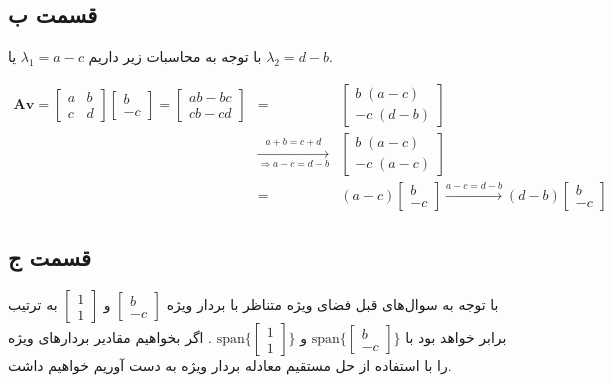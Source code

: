 \documentclass[14pt,a4]{article}
\begin{document}
\subsection*{قسمت ب}

با توجه به محاسبات زیر داریم $\lambda_1 = a-c$ یا $\lambda_2 = d-b$.

\begin{eqnarray*}
    \textbf{Av} =
        \begin{bmatrix}
            a & b \\
            c & d
        \end{bmatrix}
        \begin{bmatrix}
            b \\
            -c
        \end{bmatrix} =
        \begin{bmatrix}
            ab - bc \\
            cb - cd
        \end{bmatrix}  & = &
        \begin{bmatrix}
            b\; (a-c) \\
            -c\; (d-b)
        \end{bmatrix} \\
        & \xrightarrow[\Rightarrow a-c = d-b]{a+b=c+d} &
        \begin{bmatrix}
            b\;(a-c) \\
            -c \; (a-c)
        \end{bmatrix} \\
        & = &  (a-c) \begin{bmatrix}
            b \\
            -c
        \end{bmatrix} \xrightarrow[]{a-c = d-b} (d-b) \begin{bmatrix}
            b \\
            -c
        \end{bmatrix}
\end{eqnarray*}

\subsection*{قسمت ج}

با توجه به سوال‌های قبل فضای ویژه متناظر با بردار ویژه $\begin{bmatrix}b \\ -c \end{bmatrix}$ و $\begin{bmatrix}1 \\ 1 \end{bmatrix}$
به ترتیب برابر خواهد بود با $\text{span}\{\begin{bmatrix}b \\ -c \end{bmatrix}\}$ و  $\text{span}\{\begin{bmatrix}1 \\ 1\end{bmatrix}\}$
. اگر بخواهیم مقادیر بردار‌های ویژه را با استفاده از حل مستقیم معادله بردار ویژه به دست آوریم خواهیم داشت.
\end{document}
